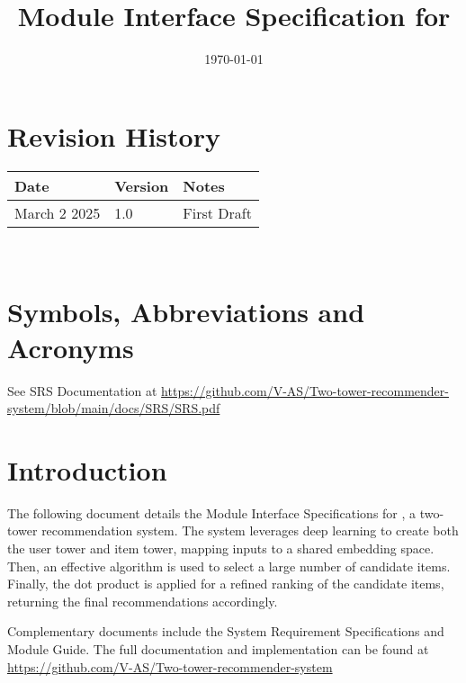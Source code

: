 \documentclass[12pt, titlepage]{article}
\begin{document}
\title{Module Interface Specification for \progname{}}

\author{\authname}

\date{\today}

\maketitle


\section{Revision History}

\begin{tabularx}{\textwidth}{p{3cm}p{2cm}X}
\toprule {\bf Date} & {\bf Version} & {\bf Notes}\\
\midrule
March 2 2025 & 1.0 & First Draft\\
\bottomrule
\end{tabularx}

~\newpage

\section{Symbols, Abbreviations and Acronyms}

See SRS Documentation at \url{https://github.com/V-AS/Two-tower-recommender-system/blob/main/docs/SRS/SRS.pdf}

\newpage

\tableofcontents

\newpage


\section{Introduction}

The following document details the Module Interface Specifications for
\progname, a two-tower recommendation system. The system leverages deep learning to create both the user tower and item tower, mapping inputs to a shared embedding space. Then, an effective algorithm is used to select a large number of candidate items. Finally, the dot product is applied for a refined ranking of the candidate items, returning the final recommendations accordingly.

Complementary documents include the System Requirement Specifications
and Module Guide.  The full documentation and implementation can be
found at \url{https://github.com/V-AS/Two-tower-recommender-system}
\end{document}
